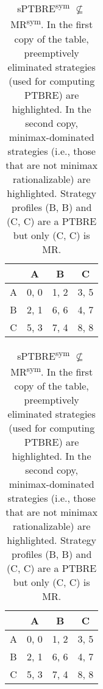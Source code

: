 \begin{table}
	\caption{
		sPTBRE\textsuperscript{sym} $\not\subseteq$ MR\textsuperscript{sym}.
		In the first copy of the table, preemptively eliminated strategies (used for computing PTBRE) are highlighted.
		In the second copy, minimax-dominated strategies (i.e., those that are not minimax rationalizable) are highlighted.
		Strategy profiles (B, B) and (C, C) are a PTBRE but only (C, C) is MR.
	}
	\label{tab:sym-ptbre-ne-mr}
	\centering
	\begin{tabular}{|c|c|c|c|}
		\hline
			& A		& B	   & C	  \\
		\hline
		A 		&\cellcolor{gray!70} 0, 0 &\cellcolor{gray!70} 1, 2 &\cellcolor{gray!70} 3, 5 \\
		\hline
		B		&\cellcolor{gray!70} 2, 1 &\cellcolor{gray!20} 6, 6 &\cellcolor{gray!70} 4, 7 \\
		\hline
		C		&\cellcolor{gray!70} 5, 3 &\cellcolor{gray!70} 7, 4 &\cellcolor{gray!00} 8, 8 \\
		\hline
	\end{tabular}
	\hspace{1em}
	\begin{tabular}{|c|c|c|c|}
		\hline
			& A		& B	   & C	  \\
		\hline
		A 		&\cellcolor{gray!70} 0, 0 &\cellcolor{gray!70} 1, 2 &\cellcolor{gray!70} 3, 5 \\
		\hline
		B		&\cellcolor{gray!70} 2, 1 &\cellcolor{gray!20} 6, 6 &\cellcolor{gray!20} 4, 7 \\
		\hline
		C		&\cellcolor{gray!70} 5, 3 &\cellcolor{gray!20} 7, 4 &\cellcolor{gray!00} 8, 8 \\
		\hline
	\end{tabular}
\end{table}

